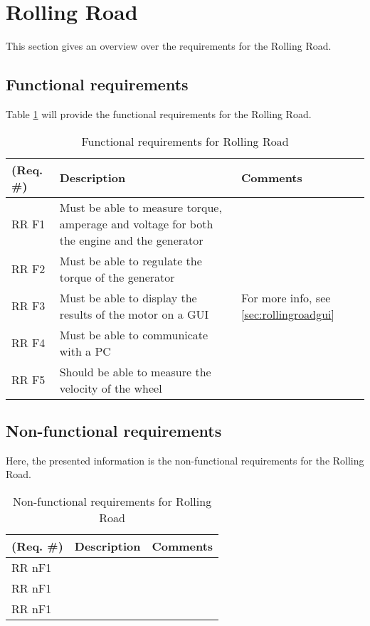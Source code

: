 \section{Rolling Road}
This section gives an overview over the requirements for the Rolling Road. 

\subsection{Functional requirements}
Table \ref{Functional:Rolling Road} will provide the functional requirements for the Rolling Road.

\begin{table}[h!]
	\centering
	\begin{tabular}{|p{2 cm}|p{4 cm}|p{3 cm}|}
	\hline
	\textbf{(Req. \#)} & \textbf{Description} & \textbf{Comments} \\\hline
	RR F1	& Must be able to measure torque, amperage and voltage for both the engine and the generator  &   \\\hline
	RR F2	& Must be able to regulate the torque of the generator &   \\\hline
	RR F3	& Must be able to display the results of the motor on a GUI & For more info, see \ref{sec:rollingroadgui}  \\\hline
	RR F4	& Must be able to communicate with a PC &   \\\hline
	RR F5	& Should be able to measure the velocity of the wheel &   \\\hline
	\end{tabular}
	\label{Functional:Rolling Road}
	\caption{Functional requirements for Rolling Road}
\end{table}

\subsection{Non-functional requirements}
Here, the presented information is the non-functional requirements for the Rolling Road.

\begin{table}[h!]
	\centering
	\label{Non-functional - Rolling Road}
	\begin{tabular}{|p{2 cm}|p{4 cm}|p{3 cm}|}
		\hline
		\textbf{(Req. \#)} & \textbf{Description} & \textbf{Comments} \\\hline
		RR nF1	&  &  \\\hline
		RR nF1	&  &   \\\hline
		RR nF1	&  &   \\\hline
	\end{tabular}
	\caption{Non-functional requirements for Rolling Road}
\end{table}